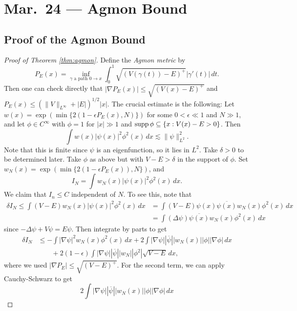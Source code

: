 \chapter{Mar.~24 --- Agmon Bound}

\section{Proof of the Agmon Bound}

\begin{proof}[Proof of Theorem \ref{thm:agmon}]
  Define the \emph{Agmon metric} by
  \[
    P_E(x) = \inf_{\text{$\gamma$ a path $0 \to x$}}
    \int_0^1 \sqrt{(V(\gamma(t)) - E)^+} |\gamma'(t)|\, dt.
  \]
  Then one can check directly that $|\nabla P_E(x)| \le \sqrt{(V(x) - E)^+}$
  and $P_E(x) \le (\|V\|_{L^\infty} + |E|)^{1 / 2} |x|$.
  The crucial estimate is the following: Let
  $w(x) = \exp(\min\{2(1 - \epsilon P_E(x), N)\})$
  for some $0 < \epsilon \ll 1$ and $N \gg 1$, and let
  $\phi \in C^\infty$ with $\phi = 1$ for
  $|x| \gg 1$ and $\operatorname{supp} \phi \subseteq \{x : V(x) - E > 0 \}$.
  Then
  \[
    \int w(x) |\psi(x)|^2 \phi^2(x)\, dx \lesssim \|\psi\|_{L^2}^2.
  \]
  Note that this is finite since $\psi$ is an
  eigenfunction, so it lies in $L^2$. Take
  $\delta > 0$ to be determined later. Take
  $\phi$ as above but with $V - E > \delta$ in the
  support of $\phi$. Set $w_N(x) = \exp(\min\{2(1 - \epsilon P_E(x)), N\})$, and
  \[
    I_N = \int w_N(x) |\psi(x)|^2 \phi^2(x)\, dx.
  \]
  We claim that $I_n \le C$ independent of
  $N$. To see this, note that
  \begin{align*}
    \delta I_N
    \le \int (V - E) w_N(x) |\psi(x)|^2 \phi^2(x)\, dx
    &= \int (V - E) \psi(x) \overline{\psi(x)} w_N(x) \phi^2(x) \, dx \\
    &= \int (\Delta \psi) \overline{\psi(x)} w_N(x) \phi^2(x)\, dx
  \end{align*}
  since $-\Delta \psi + V \psi = E\psi$. Then
  integrate by parts to get
  \begin{align*}
    \delta I_N
    &\le -\int |\nabla \psi|^2 w_N(x) \phi^2(x)\, dx
    + 2\int |\nabla \psi| |\overline{\psi}| |w_N(x)| |\phi| |\nabla \phi|\, dx \\
    & \quad \quad + 2(1 - \epsilon) \int |\nabla \psi| |\overline{\psi}| |w_N| |\phi^2| \sqrt{V - E}\, dx, \tag{$*$}
  \end{align*}
  where we used $|\nabla P_E| \le \sqrt{(V - E)^+}$.
  For the second term, we can apply Cauchy-Schwarz to
  get
  \[
    2\int |\nabla \psi| |\overline{\psi}| |w_N(x)| |\phi| |\nabla \phi|\, dx
\]
\end{proof}
